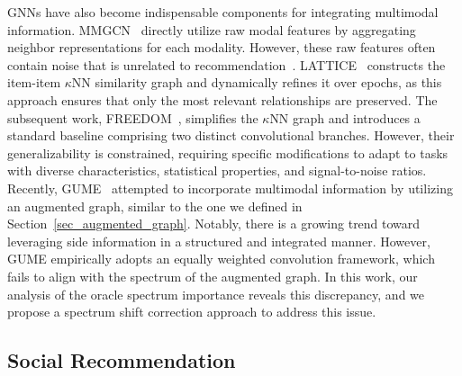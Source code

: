 GNNs have also become indispensable components for integrating multimodal information.
MMGCN~\cite{wei2019mmgcn} directly utilize raw modal features by aggregating neighbor representations for each modality.
However, these raw features often contain noise that is unrelated to recommendation~\cite{xu2024stair}.
LATTICE~\cite{zhang2021lattice} constructs the item-item $\kappa$NN similarity graph and dynamically refines it over epochs, 
as this approach ensures that only the most relevant relationships are preserved.
The subsequent work, FREEDOM~\cite{zhou2023freedom}, 
simplifies the $\kappa$NN graph and introduces a standard baseline comprising two distinct convolutional branches.
However, their generalizability is constrained, 
requiring specific modifications to adapt to tasks with diverse characteristics, statistical properties, and signal-to-noise ratios.
Recently, GUME~\cite{lin2024gume} attempted to incorporate multimodal information by utilizing an augmented graph, 
similar to the one we defined in Section~\ref{sec_augmented_graph}. 
Notably, there is a growing trend toward leveraging side information in a structured and integrated manner. 
However, GUME empirically adopts an equally weighted convolution framework, 
which fails to align with the spectrum of the augmented graph. 
In this work, our analysis of the oracle spectrum importance reveals this discrepancy, 
and we propose a spectrum shift correction approach to address this issue.



\subsection{Social Recommendation}

